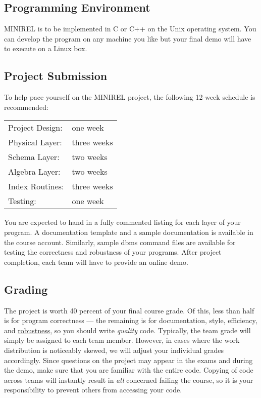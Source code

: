\subsection{Programming Environment}
MINIREL is to be implemented in C or C++ on the Unix operating
system.  You can develop the program on any machine you like
but your final demo will have to execute on a Linux box.

\subsection{Project Submission}
To help pace yourself on the MINIREL project, 
the following 12-week schedule is recommended:

\begin{center}
\begin{tabular}{l l}
Project Design:    & one week \\
Physical Layer:    & three weeks \\
Schema Layer:      & two weeks \\
Algebra Layer:     & two weeks \\
Index Routines:    & three weeks\\
Testing:           & one week \\
\end{tabular}
\end{center}

\noindent
You are expected to hand in a fully commented listing for each layer of
your program.  A documentation template and a sample documentation is
available in the course account.  Similarly, sample dbms command files
are available for testing the correctness and robustness of your
programs.  After project completion, each team will have to provide an
online demo.

\subsection{Grading}
The project is worth 40 percent of your final course grade.  Of
this, less than half is for program correctness  --- the remaining
is for documentation, style, efficiency, and \underline{robustness},
so you should write \emph{quality} code.  Typically, the team
grade will simply be assigned to each team member.  However, in
cases where the work distribution is noticeably skewed, we will
adjust your individual grades accordingly.  Since questions on the
project may appear in the exams and during the demo, make sure that
you are familiar with the entire code.  Copying of code across
teams will instantly result in \emph{all} concerned failing the
course, so it is your responsibility to prevent others from accessing
your code.


